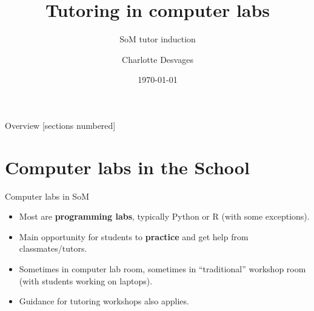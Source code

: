 \documentclass[10pt]{beamer}
\title{Tutoring in computer labs}
\subtitle{SoM tutor induction}
\date{\today}
\author{Charlotte Desvages}
\institute{School of Mathematics}
\begin{document}

\maketitle

\begin{frame}{Overview}
  [sections numbered]
  \tableofcontents%
\end{frame}

\section{Computer labs in the School}

\begin{frame}[fragile]{Computer labs in SoM}

    \begin{itemize}[<+->]
        \item Most are \textbf{programming labs}, typically Python or R (with some exceptions).
        \item Main opportunity for students to \textbf{practice} and get help from classmates/tutors.
        \item Sometimes in computer lab room, sometimes in ``traditional'' workshop room (with students working on laptops).
        \item Guidance for tutoring workshops also applies.
    \end{itemize}

\end{frame}
\end{document}
